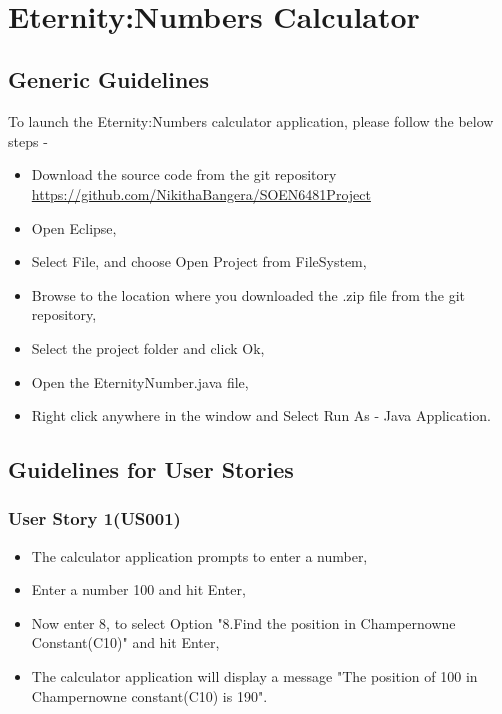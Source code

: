 \documentclass[12pt, a4paper]{report}
\begin{document}
\\
\chapter{Eternity:Numbers Calculator}

\section{Generic Guidelines}

\quad To launch the Eternity:Numbers calculator application, please follow the below steps - 

\begin{itemize}
    \item Download the source code from the git repository \newline \underline{https://github.com/NikithaBangera/SOEN6481Project}
    \item Open Eclipse,
    \item Select File, and choose Open Project from FileSystem,
    \item Browse to the location where you downloaded the .zip file from the git repository,
    \item Select the project folder and click Ok,
    \item Open the EternityNumber.java file,
    \item Right click anywhere in the window and Select Run As - Java Application.
\end{itemize} 

\section{Guidelines for User Stories}

\subsection{User Story 1(US001)}
\begin{itemize}
    \item The calculator application prompts to enter a number,
    \item Enter a number 100 and hit Enter,
    \item Now enter 8, to select Option "8.Find the position in Champernowne Constant(C10)" and hit Enter,
    \item The calculator application will display a message "The position of 100 in Champernowne constant(C10) is 190".
\end{itemize}
\end{document}

